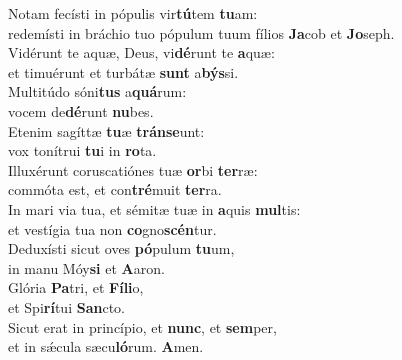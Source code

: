 \evenverse Notam fecísti in pópulis vir\textbf{tú}tem \textbf{tu}am:~\*\\
\evenverse redemísti in bráchio tuo pópulum tuum fílios \textbf{Ja}cob et \textbf{Jo}seph.\\
\oddverse Vidérunt te aquæ, Deus, vi\textbf{dé}runt te \textbf{a}quæ:~\*\\
\oddverse et timuérunt et turbátæ \textbf{sunt} a\textbf{býs}si.\\
\evenverse Multitúdo sóni\textbf{tus} a\textbf{quá}rum:~\*\\
\evenverse vocem de\textbf{dé}runt \textbf{nu}bes.\\
\oddverse Etenim sagíttæ \textbf{tu}æ \textbf{trán}\textbf{se}unt:~\*\\
\oddverse vox tonítrui \textbf{tu}i in \textbf{ro}ta.\\
\evenverse Illuxérunt coruscatiónes tuæ \textbf{or}bi \textbf{ter}ræ:~\*\\
\evenverse commóta est, et con\textbf{tré}muit \textbf{ter}ra.\\
\oddverse In mari via tua, et sémitæ tuæ in \textbf{a}quis \textbf{mul}tis:~\*\\
\oddverse et vestígia tua non \textbf{co}gno\textbf{scén}tur.\\
\evenverse Deduxísti sicut oves \textbf{pó}pulum \textbf{tu}um,~\*\\
\evenverse in manu Móy\textbf{si} et \textbf{A}aron.\\
\oddverse Glória \textbf{Pa}tri, et \textbf{Fí}\textbf{li}o,~\*\\
\oddverse et Spi\textbf{rí}tui \textbf{San}cto.\\
\evenverse Sicut erat in princípio, et \textbf{nunc}, et \textbf{sem}per,~\*\\
\evenverse et in sǽcula sæcu\textbf{ló}rum. \textbf{A}men.\\
